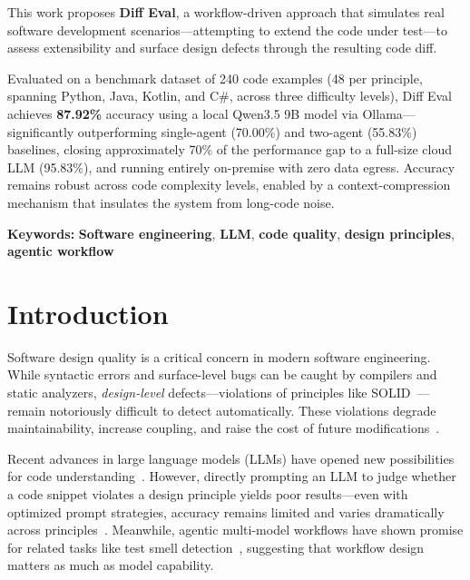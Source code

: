 \documentclass[12pt,a4paper,oneside]{report}
\begin{document}
This work proposes \textbf{Diff Eval}, a workflow-driven approach that simulates real software development scenarios---attempting to extend the code under test---to assess extensibility and surface design defects through the resulting code diff.

Evaluated on a benchmark dataset of 240 code examples (48 per principle, spanning Python, Java, Kotlin, and C\#, across three difficulty levels), Diff Eval achieves \textbf{87.92\%} accuracy using a local Qwen3.5 9B model via Ollama---significantly outperforming single-agent (70.00\%) and two-agent (55.83\%) baselines, closing approximately 70\% of the performance gap to a full-size cloud LLM (95.83\%), and running entirely on-premise with zero data egress. Accuracy remains robust across code complexity levels, enabled by a context-compression mechanism that insulates the system from long-code noise.

\vspace{1em}
\noindent\textbf{Keywords:} \textbf{Software engineering}, \textbf{LLM}, \textbf{code quality}, \textbf{design principles}, \textbf{agentic workflow}

\setcounter{tocdepth}{1}
\listoffigures\newpage

\setcounter{tocdepth}{1}
\listoftables\newpage

\clearpage
{}

\chapter{Introduction}
\label{ch:introduction}

Software design quality is a critical concern in modern software engineering. While syntactic errors and surface-level bugs can be caught by compilers and static analyzers, \emph{design-level} defects---violations of principles like SOLID~\cite{Martin2000, Martin2017}---remain notoriously difficult to detect automatically. These violations degrade maintainability, increase coupling, and raise the cost of future modifications~\cite{Sharma2018, Palomba2015}.

Recent advances in large language models (LLMs) have opened new possibilities for code understanding~\cite{Fan2023}. However, directly prompting an LLM to judge whether a code snippet violates a design principle yields poor results---even with optimized prompt strategies, accuracy remains limited and varies dramatically across principles~\cite{Pehlivan2025}. Meanwhile, agentic multi-model workflows have shown promise for related tasks like test smell detection~\cite{Melo2025}, suggesting that workflow design matters as much as model capability.
\end{document}
